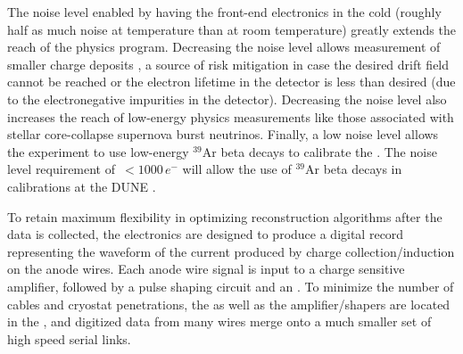 The noise level enabled by having the front-end electronics in the cold (roughly half as much noise at  temperature than at room temperature) greatly extends the reach of the  physics program.  Decreasing the noise level allows measurement of smaller charge deposits , a source of risk mitigation in case the desired drift field cannot be reached or the electron lifetime in the detector is less than desired (due to the electronegative impurities in the detector). Decreasing the noise level also increases the reach of low-energy physics measurements like those associated with stellar core-collapse supernova burst neutrinos.  Finally, a low noise level allows the experiment to use low-energy $\mathrm{{}^{39}Ar}$ beta decays to calibrate the  .  The noise level requirement of \,$<\num{1000}\,e^-$ will allow the use of $\mathrm{{}^{39}Ar}$ beta decays in calibrations at the DUNE .

To retain maximum flexibility in optimizing reconstruction algorithms after the  data is collected, the  electronics are designed to produce a digital record representing the waveform of the current produced by charge collection/induction on the anode wires.  Each anode wire signal is input to a charge sensitive amplifier, followed by a pulse shaping circuit and an .  To minimize the number of cables and cryostat penetrations, the  as well as the amplifier/shapers are located in the , and digitized data from many wires merge onto a much smaller set of high speed serial links.  %


